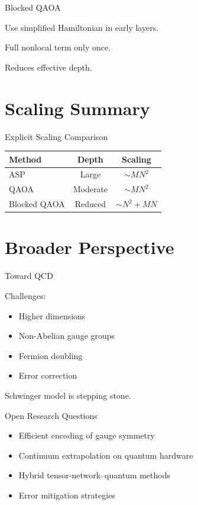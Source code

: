 \documentclass[11pt]{beamer}
\begin{document}
\begin{frame}{Blocked QAOA}

Use simplified Hamiltonian in early layers.

Full nonlocal term only once.

Reduces effective depth.
\end{frame}


\section{Scaling Summary}

\begin{frame}{Explicit Scaling Comparison}

\begin{tabular}{lcc}
Method & Depth & Scaling \\
\hline
ASP & Large & $\sim M N^2$ \\
QAOA & Moderate & $\sim M N^2$ \\
Blocked QAOA & Reduced & $\sim N^2 + MN$ \\
\hline
\end{tabular}
\end{frame}

\section{Broader Perspective}

\begin{frame}{Toward QCD}

Challenges:

\begin{itemize}
\item Higher dimensions
\item Non-Abelian gauge groups
\item Fermion doubling
\item Error correction
\end{itemize}

Schwinger model is stepping stone.
\end{frame}

\begin{frame}{Open Research Questions}

\begin{itemize}
\item Efficient encoding of gauge symmetry
\item Continuum extrapolation on quantum hardware
\item Hybrid tensor-network–quantum methods
\item Error mitigation strategies
\end{itemize}
\end{frame}
\end{document}
